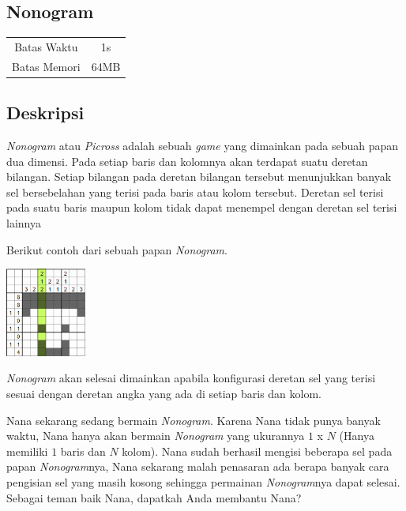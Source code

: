 \documentclass{article}
\begin{document}
\begin{center}
    \section*{Nonogram} %

    \begin{tabular}{ | c c | }
        \hline
        Batas Waktu  & 1s \\    %
        Batas Memori & 64MB \\  %
        \hline
    \end{tabular}
\end{center}

\subsection*{Deskripsi}

\textit{Nonogram} atau \textit{Picross} adalah sebuah \textit{game} yang dimainkan pada sebuah papan dua dimensi.
Pada setiap baris dan kolomnya akan terdapat suatu deretan bilangan.
Setiap bilangan pada deretan bilangan tersebut menunjukkan banyak sel bersebelahan 
yang terisi pada baris atau kolom tersebut. Deretan sel terisi pada suatu baris maupun kolom tidak 
dapat menempel dengan deretan sel terisi lainnya

Berikut contoh dari sebuah papan \textit{Nonogram}.

\includegraphics[width=100px]{Nonogram-Steve}

 \textit{Nonogram} akan selesai dimainkan apabila konfigurasi deretan sel yang terisi 
sesuai dengan deretan angka yang ada di setiap baris dan kolom.

Nana sekarang sedang bermain \textit{Nonogram}. Karena Nana tidak punya banyak waktu, 
Nana hanya akan bermain \textit{Nonogram} yang ukurannya $1$ x $N$ (Hanya memiliki $1$ baris dan $N$ kolom). 
Nana sudah berhasil mengisi beberapa sel pada papan \textit{Nonogram}nya, Nana sekarang malah penasaran ada 
berapa banyak cara pengisian sel yang masih kosong sehingga permainan \textit{Nonogram}nya dapat selesai. Sebagai teman baik Nana, dapatkah Anda membantu Nana?
\end{document}
